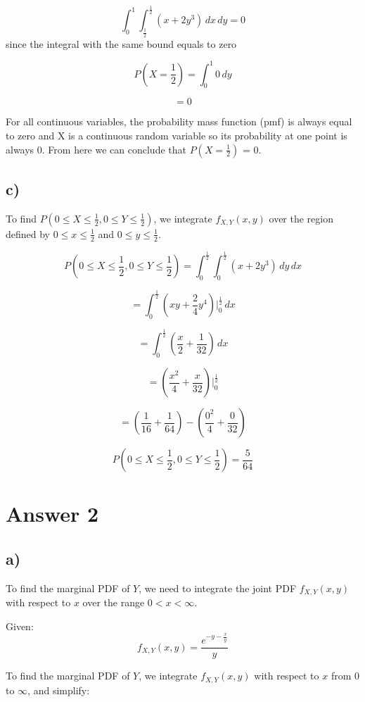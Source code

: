 \documentclass[12pt]{article}
\begin{document}
\[ \int_{0}^{1} \int_{\frac{1}{2}}^{\frac{1}{2}} (x + 2y^3) \, dx \, dy = 0 \] since the integral with the same bound equals to zero 

\[ P(X = \frac{1}{2}) = \int_{0}^{1} 0 \, dy \]

\[ = 0 \]

For all continuous variables, the probability mass function (pmf) is always equal to zero and X is a continuous random variable so its probability at one point is always 0. From here we can conclude that \( P(X = \frac{1}{2}) \) = 0.

\subsection*{c)} 
To find \( P(0 \leq X \leq \frac{1}{2}, 0 \leq Y \leq \frac{1}{2}) \), we integrate \( f_{X,Y}(x, y) \) over the region defined by \( 0 \leq x \leq \frac{1}{2} \) and \( 0 \leq y \leq \frac{1}{2} \).

\[ P(0 \leq X \leq \frac{1}{2}, 0 \leq Y \leq \frac{1}{2}) = \int_{0}^{\frac{1}{2}} \int_{0}^{\frac{1}{2}} (x + 2y^3) \, dy \, dx \]

\[ = \int_{0}^{\frac{1}{2}} ( xy + \frac{2}{4}y^4 )  \Biggr|_{0}^{\frac{1}{2}} \, dx \] 

\[ = \int_{0}^{\frac{1}{2}} \left( \frac{x}{2} + \frac{1}{32} \right) \, dx \]

\[ =( \frac{x^2}{4} + \frac{x}{32} ) \Biggr|_{0}^{\frac{1}{2}} \]

\[ = \left( \frac{1}{16} + \frac{1}{64} \right) - \left( \frac{0^2}{4} + \frac{0}{32} \right) \]



\[ P(0 \leq X \leq \frac{1}{2}, 0 \leq Y \leq \frac{1}{2}) = \frac{5}{64} \]




\section*{Answer 2}
\subsection*{a)} 
To find the marginal PDF of \( Y \), we need to integrate the joint PDF \( f_{X,Y}(x, y) \) with respect to \( x \) over the range \( 0 < x < \infty \).

Given:
\[ f_{X,Y}(x, y) = \frac{e^{-y - \frac{x}{y}}}{y} \]

To find the marginal PDF of \( Y \), we integrate \( f_{X,Y}(x, y) \) with respect to \( x \) from \( 0 \) to \( \infty \), and simplify:
\end{document}
